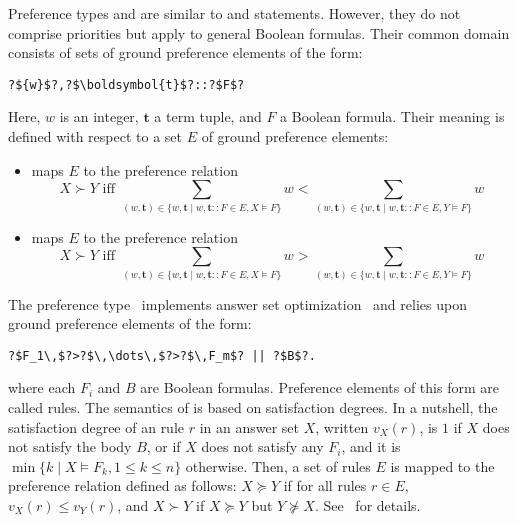 Preference types  and 
are similar to  and  statements.
However, they do not comprise priorities but apply to general Boolean formulas.
Their common domain consists of sets of ground preference elements of the form:
\begin{lstlisting}[numbers=none,escapechar=?]
?${w}$?,?$\boldsymbol{t}$?::?$F$?
\end{lstlisting}
Here, ${w}$ is an integer, $\boldsymbol{t}$ a term tuple, and $F$ a Boolean formula. 
%
Their meaning is defined with respect to a set $E$ of ground preference elements:
\begin{itemize}
\item
{} maps $E$ to the preference relation
\[
X \succ Y 
\text{ iff }
\sum_{(w,\boldsymbol{t})\in\{w,\boldsymbol{t}\mid w,\boldsymbol{t}\mathtt{::}F\in E, X\models F\}}w
<
\sum_{(w,\boldsymbol{t})\in\{w,\boldsymbol{t}\mid w,\boldsymbol{t}\mathtt{::}F\in E, Y\models F\}}w
\]
\item
{} maps $E$ to the preference relation
\[
X \succ Y 
\text{ iff }
\sum_{(w,\boldsymbol{t})\in\{w,\boldsymbol{t}\mid w,\boldsymbol{t}\mathtt{::}F\in E, X\models F\}}w
>
\sum_{(w,\boldsymbol{t})\in\{w,\boldsymbol{t}\mid w,\boldsymbol{t}\mathtt{::}F\in E, Y\models F\}}w
\]
\end{itemize}

The preference type~ implements answer set optimization~\cite{brnitr03a} and relies upon
ground preference elements of the form:
\begin{lstlisting}[numbers=none,escapechar=?]
?$F_1\,$?>?$\,\dots\,$?>?$\,F_m$? || ?$B$?.
\end{lstlisting}
where each $F_i$ and $B$ are Boolean formulas.
Preference elements of this form are called  rules.  
The semantics of  is based on satisfaction degrees.
In a nutshell,
the satisfaction degree of an  rule $r$ in an answer set $X$, 
written $v_X(r)$, is 
$1$ if $X$ does not satisfy the body $B$, %
or  if $X$ does not satisfy any $F_i$, 
and it is $\min\{k \mid X \models F_k, 1\leq k\leq n\}$ otherwise.
Then, a set of  rules $E$ is mapped to the preference relation defined as follows:
$X \succeq Y$ if for all rules $r \in E$, $v_X(r) \leq v_Y(r)$, 
and $X \succ Y$ if $X \succeq Y$ but $Y \not\succeq X$. 
See~\cite{brnitr03a} for details.

